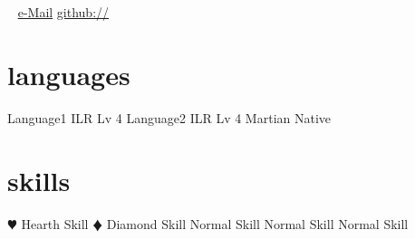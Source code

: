 \begin{aside}
    \section{\portrait{\myphoto}}
    \address
    \phone
    ~
    \href{mailto:\email}{e-Mail}
    \href{\website}{github://\firstname}
    \section{languages}
    Language1 ILR Lv 4
    Language2 ILR Lv 4
    Martian Native
    \section{skills}
    {\color{solarized-red}$\varheartsuit$} Hearth Skill
    {\color{solarized-blue}$\vardiamondsuit$} Diamond Skill
    Normal Skill
    Normal Skill
    Normal Skill
\end{aside}
